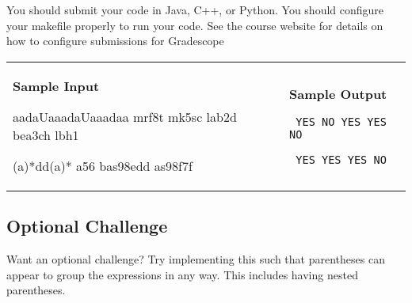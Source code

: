 \documentclass[11pt]{article}
\begin{document}
You should submit your code in Java, C++, or Python. You should configure your makefile properly to run your code. See the course website for details on how to configure submissions for Gradescope


\vspace{0.25in}\hspace{-0.3in}\begin{tabular}{ll}

\parbox{3in}{{\large\bf Sample Input}

\vspace{0.15in}

{\tt 

aadaUaaadaUaaadaa  \linebreak
mrf8t \linebreak
mk5sc \linebreak
lab2d \linebreak
bea3ch \linebreak
lbh1

}

\vspace{0.15in}

{\tt

(a)*dd(a)*   \linebreak
a56 \linebreak
bas98edd \linebreak
as98f7f

}
}

&

\parbox{3in}{{\large\bf Sample Output}

\vspace{0.15in}

{\tt
YES \linebreak
NO \linebreak
YES \linebreak
YES \linebreak
NO
}

\vspace{0.15in}

{\tt
YES \linebreak
YES \linebreak
YES \linebreak
NO
}
}

\\
\end{tabular}

\subsection*{Optional Challenge}

Want an optional challenge? Try implementing this such that parentheses can appear to group the expressions in any way. This includes having nested parentheses.
\end{document}
